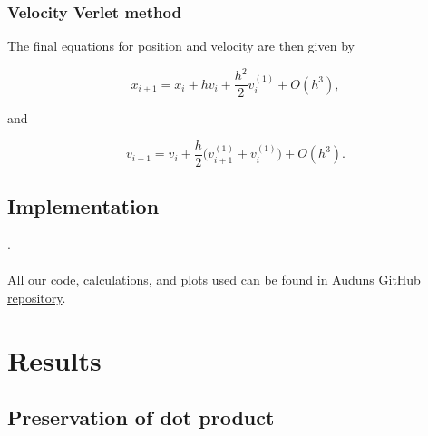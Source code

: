 \documentclass[a4paper, fontsize=11pt]{article}
\begin{document}
\subsubsection{Velocity Verlet method}



The final equations for position and velocity are then given by

\begin{equation}
x_{i+1} = x_{i} + h v_{i} + \dfrac{h^2}{2} v_{i}^{(1)} + O(h^3),
\end{equation}

and 

\begin{equation}
v_{i+1} = v_{i} + \dfrac{h}{2} \Big( v_{i+1}^{(1)} +v_{i}^{(1)} \Big) + O(h^3).
\end{equation}



\subsection{Implementation}

.\cite{H-Jensen} 


\paragraph{}
All our code, calculations, and plots used can be found in \href{https://github.com/auduntre/FYS4150/tree/master/Project%203}{Auduns GitHub repository}.

\section{Results}
\subsection{Preservation of dot product}
\end{document}
